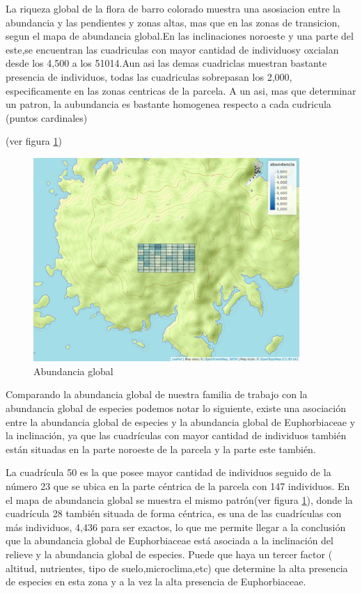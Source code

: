 \documentclass[11pt,]{article}
\begin{document}
La riqueza global de la flora de barro colorado muestra una asosiacion
entre la abundancia y las pendientes y zonas altas, mas que en las zonas
de transicion, segun el mapa de abundancia global.En las inclinaciones
noroeste y una parte del este,se encuentran las cuadriculas con mayor
cantidad de individuosy oxcialan desde los 4,500 a los 51014.Aun asi las
demas cuadriclas muestran bastante presencia de individuos, todas las
cuadriculas sobrepasan los 2,000, especificamente en las zonas centricas
de la parcela. A un asi, mas que determinar un patron, la aubundancia es
bastante homogenea respecto a cada cudricula (puntos cardinales)

(ver figura \ref{fig:cuadro_de_abundancia_global})

\begin{figure}
\centering
\includegraphics[width=0.90000\textwidth]{mapa_cuadros_abun_global.png}
\caption{\label{fig:cuadro_de_abundancia_global}Abundancia global}
\end{figure}

Comparando la abundancia global de nuestra familia de trabajo con la
abundancia global de especies podemos notar lo siguiente, existe una
asociación entre la abundancia global de especies y la abundancia global
de Euphorbiaceae y la inclinación, ya que las cuadrículas con mayor
cantidad de individuos también están situadas en la parte noroeste de la
parcela y la parte este también.

La cuadrícula 50 es la que posee mayor cantidad de individuos seguido de
la número 23 que se ubica en la parte céntrica de la parcela con 147
individuos. En el mapa de abundancia global se muestra el mismo
patrón(ver figura \ref{fig:cuadro_de_abundancia_global}), donde la
cuadrícula 28 también situada de forma céntrica, es una de las
cuadrículas con más individuos, 4,436 para ser exactos, lo que me
permite llegar a la conclusión que la abundancia global de Euphorbiaceae
está asociada a la inclinación del relieve y la abundancia global de
especies. Puede que haya un tercer factor ( altitud, nutrientes, tipo de
suelo,microclima,etc) que determine la alta presencia de especies en
esta zona y a la vez la alta presencia de Euphorbiaceae.
\end{document}
